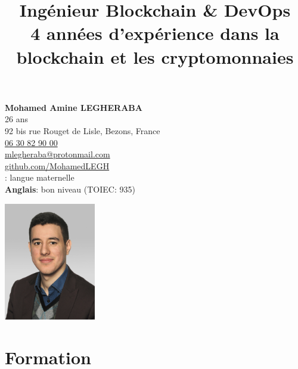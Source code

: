 \documentclass[10pt]{article}
\title{\bfseries{\huge{Ingénieur Blockchain \& DevOps}}\\[0.75cm] \Large{4 années d'expérience dans la blockchain et les cryptomonnaies} }
\author{\bfseries\Huge \vspace{-4ex}}
\date{}
\begin{document}
\begin{minipage}[t]{0.80\textwidth}
\textbf{\Large{Mohamed Amine LEGHERABA}}\\
\vspace{4ex}26 ans\\
92 bis rue Rouget de Lisle, Bezons, France\\
\href{tel:0630829000}{06 30 82 90 00}\\
\href{mailto:mlegheraba@protonmail.com}{mlegheraba@protonmail.com}\\
\href{https://github.com/MohamedLEGH}{github.com/MohamedLEGH}\\
\vspace{5ex}{\bf Français}: langue maternelle \\
{\bf Anglais}: bon niveau (TOIEC: 935) \\
\end{minipage}
\begin{minipage}[t]{0.20\textwidth}
\vspace{-3ex}
\includegraphics[width=4cm]{figures/Legheraba-Mohamed.jpg}
\end{minipage}
{\let\newpage\relax\maketitle}
\thispagestyle{empty}

\vspace{-10ex}

\section*{Formation}

\vspace{2ex}
\end{document}
